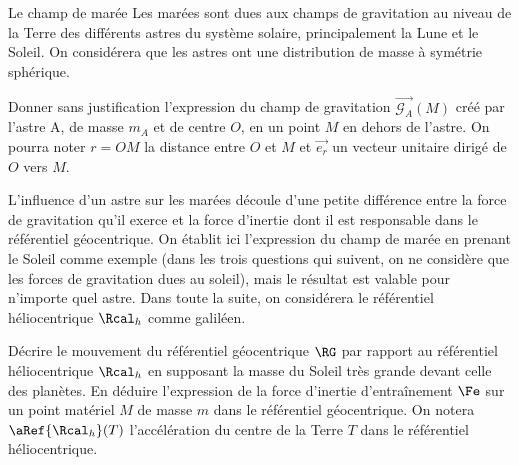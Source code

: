 \begin{exo}[PC][2][TD]{Le champ de marée}
  Les marées sont dues aux champs de gravitation au niveau de la Terre des différents astres du système solaire, principalement la Lune et le Soleil. On considérera que les astres ont une distribution de masse à symétrie sphérique.

  \begin{quest}
  \item Donner sans justification l'expression du champ de gravitation $\Vec {{\mathcal{G}_A}} (M)$ créé par l'astre A, de masse $m_A$ et de centre $O$, en un point $M$ en dehors de l'astre. On pourra noter $r=OM$ la distance entre $O$ et $M$ et
  $\Vec {{e_r}} $ un vecteur unitaire dirigé de $O$ vers $M$.

  \end{quest}
   L'influence d'un astre sur les marées découle d'une petite différence entre la force de gravitation qu'il exerce et la force d'inertie dont il est responsable dans le référentiel géocentrique. On établit ici l'expression du champ de marée en prenant le Soleil comme exemple (dans les trois questions qui suivent, on ne considère que les forces de gravitation dues au soleil), mais le résultat est valable pour n'importe quel astre.
  Dans toute la suite, on considérera le référentiel héliocentrique $\Rcal_h$ comme galiléen.
  \begin{quest}

  \item Décrire le mouvement du référentiel géocentrique $\RG$ par rapport au référentiel héliocentrique $\Rcal_h$ en supposant la masse du Soleil très grande devant celle des planètes. En déduire l'expression de la force d'inertie d'entraînement $\Fe$ sur un point matériel $M$ de masse $m$ dans le référentiel géocentrique.
  On notera $\aRef{\Rcal_h}(T)$ l'accélération du  centre de la Terre $T$ dans le référentiel héliocentrique.


\end{quest}
\end{exo}
